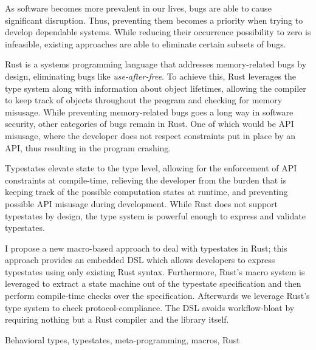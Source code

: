 

As software becomes more prevalent in our lives, bugs are able to cause significant disruption.
Thus, preventing them becomes a priority when trying to develop dependable systems.
While reducing their occurrence possibility to zero is infeasible,
existing approaches are able to eliminate certain subsets of bugs.

Rust is a systems programming language that addresses memory-related bugs by design,
eliminating bugs like \emph{use-after-free}.
To achieve this, Rust leverages the type system along with information about object lifetimes,
allowing the compiler to keep track of objects throughout the program and checking for memory misusage.
While preventing memory-related bugs goes a long way in software security, other categories of bugs remain in Rust.
One of which would be \gls{API} misusage, where the developer does not respect constraints put in place by an \gls{API},
thus resulting in the program crashing.

Typestates elevate state to the type level, allowing for the enforcement of \gls{API} constraints at compile-time,
relieving the developer from the burden that is keeping track of the possible computation states at runtime,
and preventing possible \gls{API} misusage during development.
While Rust does not support typestates by design,
the type system is powerful enough to express and validate typestates.

I propose a new macro-based approach to deal with typestates in Rust;
this approach provides an embedded DSL which allows developers to express typestates using only existing Rust syntax.
Furthermore, Rust's macro system is leveraged to extract a state machine out of the typestate specification and
then perform compile-time checks over the specification.
Afterwards we leverage Rust's type system to check protocol-compliance.
The DSL avoids workflow-bloat by requiring nothing but a Rust compiler and the library itself.


\begin{keywords}
Behavioral types, typestates, meta-programming, macros, Rust
\end{keywords}
